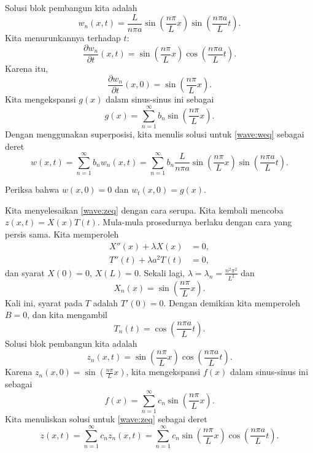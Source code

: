 Solusi blok pembangun kita adalah
\begin{equation*}
w_n(x,t) = 
\frac{L}{n \pi a} 
\sin \left( \frac{n \pi}{L} x \right)
\sin \left( \frac{n \pi a}{L} t \right) .
\end{equation*}
Kita menurunkannya terhadap $t$:
\begin{equation*}
\frac{\partial w_n}{\partial t}(x,t) = 
\sin \left( \frac{n \pi}{L} x \right)
\cos \left( \frac{n \pi a}{L} t \right) .
\end{equation*}
Karena itu,
\begin{equation*}
\frac{\partial w_n}{\partial t}(x,0) =
\sin \left( \frac{n \pi}{L} x \right) .
\end{equation*}
Kita mengekspansi $g(x)$ dalam sinus-sinus ini sebagai
\begin{equation*}
g(x) =
\sum_{n=1}^\infty b_n \sin \left( \frac{n \pi}{L} x \right) .
\end{equation*}
Dengan menggunakan superposisi,
kita menulis solusi untuk \eqref{wave:weq} sebagai deret
\begin{equation*}
w(x,t) =
\sum_{n=1}^\infty
b_n
w_n(x,t)
=
\sum_{n=1}^\infty
b_n
\frac{L}{n \pi a}
\sin \left( \frac{n \pi}{L} x \right)
\sin \left( \frac{n \pi a}{L} t \right) .
\end{equation*}

\begin{exercise}
Periksa bahwa $w(x,0) = 0$ dan
$w_t(x,0) = g(x)$.
\end{exercise}

Kita menyelesaikan \eqref{wave:zeq} dengan cara serupa.  Kita kembali mencoba
$z(x,t) = X(x)T(t)$.  Mula-mula prosedurnya berlaku dengan cara yang persis sama.
Kita memperoleh
\begin{align*}
X''(x) + \lambda X(x) &= 0 , \\
T''(t) + \lambda a^2 T(t) &= 0 ,
\end{align*}
dan syarat $X(0) = 0$, $X(L) = 0$.  Sekali lagi,
$\lambda = \lambda_n = \frac{n^2 \pi^2}{L^2}$ dan
\begin{equation*}
X_n(x) = \sin \left( \frac{n \pi}{L} x \right) .
\end{equation*}
Kali ini,
syarat pada $T$ adalah $T'(0) = 0$.  Dengan demikian 
kita memperoleh $B = 0$, dan kita mengambil
\begin{equation*}
T_n(t) = \cos \left( \frac{n \pi a}{L} t \right).
\end{equation*}
Solusi blok pembangun kita adalah
\begin{equation*}
z_n(x,t) = 
\sin \left( \frac{n \pi}{L} x \right)
\cos \left( \frac{n \pi a}{L} t \right) .
\end{equation*}
Karena $z_n(x,0) = \sin \left( \frac{n \pi}{L} x \right)$,
kita mengekspansi $f(x)$ dalam sinus-sinus ini sebagai
\begin{equation*}
f(x) =
\sum_{n=1}^\infty c_n \sin \left( \frac{n \pi}{L} x \right) .
\end{equation*}
Kita
menuliskan solusi untuk \eqref{wave:zeq} sebagai deret
\begin{equation*}
z(x,t) =
\sum_{n=1}^\infty
c_n
z_n(x,t)
=
\sum_{n=1}^\infty
c_n
\sin \left( \frac{n \pi}{L} x \right)
\cos \left( \frac{n \pi a}{L} t \right) .
\end{equation*}

